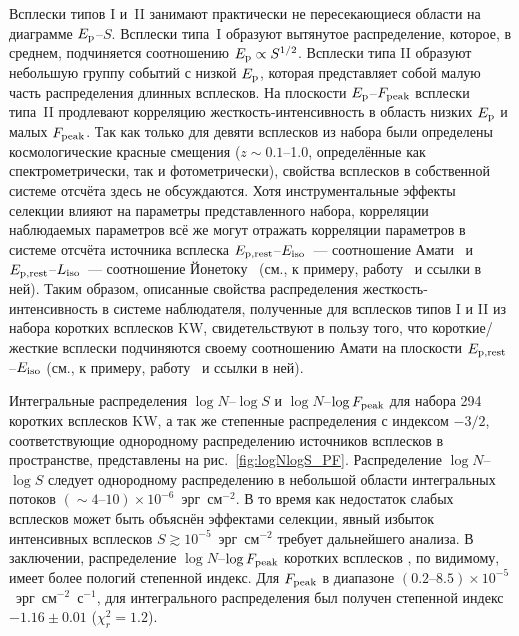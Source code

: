 Всплески типов I и~II занимают практически не пересекающиеся области на диаграмме $E_{\mathrm{p}}$--$S$.
Всплески типа~I образуют вытянутое распределение, которое, в среднем, подчиняется 
соотношению $E_{\mathrm{p}} \propto S^{1/2}$. Всплески типа II образуют небольшую группу событий
с низкой $E_{\mathrm{p}}$, которая представляет собой малую часть распределения длинных всплесков.
На плоскости $E_{\mathrm{p}}$--$F_{\mathrm{peak}}$ всплески типа~II продлевают корреляцию 
жесткость-интенсивность в область низких $E_{\mathrm{p}}$ и малых $F_{\mathrm{peak}}$.
Так как только для девяти всплесков из набора были определены космологические 
красные смещения ($z\sim 0.1$--1.0, определённые как спектрометрически, так и
фотометрически), свойства всплесков в собственной системе отсчёта здесь не обсуждаются.
Хотя инструментальные эффекты селекции влияют на параметры представленного набора,
корреляции наблюдаемых параметров всё же могут отражать корреляции параметров 
в системе отсчёта источника всплеска $E_{\mathrm{p,rest}}$--$E_{\mathrm{iso}}$~--- 
соотношение Амати~\citep{Amati_2002AandA} и $E_{\mathrm{p,rest}}$--$L_{\mathrm{iso}}$~--- 
соотношение Йонетоку~\citep{Yonetoku_2004ApJ}
(см., к примеру, работу~\citep{Nava_2008MNRAS} и ссылки в ней).
Таким образом, описанные свойства распределения жесткость-интенсивность 
в системе наблюдателя, полученные для всплесков типов I и II из набора коротких 
всплесков KW, свидетельствуют в пользу того, что короткие/жесткие всплески подчиняются 
своему соотношению Амати на плоскости $E_{\mathrm{p,rest}}$--$E_{\mathrm{iso}}$
(см., к примеру, работу~\citep{Nava_2011MNRAS} и ссылки в ней).

Интегральные распределения $\log N$--$\log S$ и $\log N$--$\log F_{\mathrm{peak}}$
для набора 294 коротких всплесков KW, а так же степенные распределения с индексом $-3/2$, 
соответствующие однородному распределению источников всплесков в пространстве,
представлены на рис.~\ref{fig:logNlogS_PF}.
Распределение $\log N$--$\log S$ следует однородному распределению в небольшой 
области интегральных потоков $(\sim 4\textrm{--}10)\times 10^{-6}$~эрг~см$^{-2}$.
В то время как недостаток слабых всплесков может быть объяснён эффектами селекции,
явный избыток интенсивных всплесков $S \gtrsim 10^{-5}$~эрг~см$^{-2}$ требует
дальнейшего анализа.
В заключении, распределение $\log N$--$\log F_{\mathrm{peak}}$ коротких всплесков \kws,
по видимому, имеет более пологий степенной индекс. Для $F_{\mathrm{peak}}$ в диапазоне 
$(0.2\textrm{--}8.5)\times 10^{-5}$~эрг~см$^{-2}$~с$^{-1}$, для интегрального распределения 
был получен степенной индекс $-1.16 \pm 0.01$ ($\chi^2_r = 1.2$).

